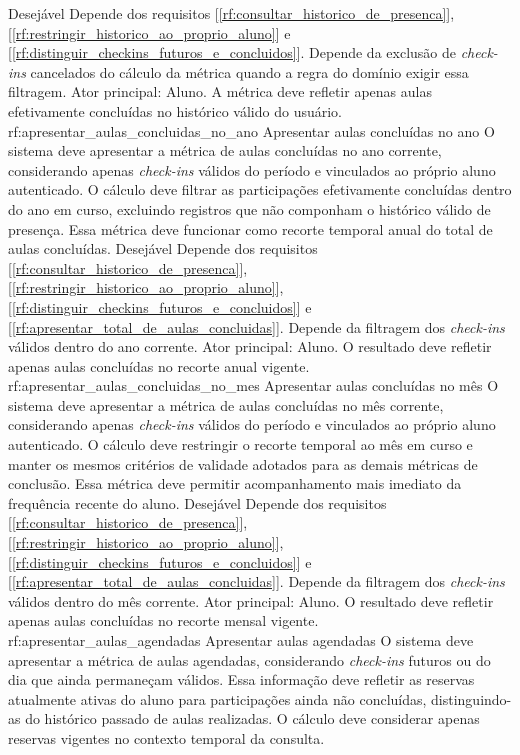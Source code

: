 {Desejável}
{Depende dos requisitos [\ref{rf:consultar_historico_de_presenca}], [\ref{rf:restringir_historico_ao_proprio_aluno}] e [\ref{rf:distinguir_checkins_futuros_e_concluidos}]. Depende da exclusão de \textit{check-ins} cancelados do cálculo da métrica quando a regra do domínio exigir essa filtragem.}
{Ator principal: Aluno. A métrica deve refletir apenas aulas efetivamente concluídas no histórico válido do usuário.}
\reqfuncfull
{rf:apresentar_aulas_concluidas_no_ano}
{Apresentar aulas concluídas no ano}
{O sistema deve apresentar a métrica de aulas concluídas no ano corrente, considerando apenas \textit{check-ins} válidos do período e vinculados ao próprio aluno autenticado. O cálculo deve filtrar as participações efetivamente concluídas dentro do ano em curso, excluindo registros que não componham o histórico válido de presença. Essa métrica deve funcionar como recorte temporal anual do total de aulas concluídas.}
{Desejável}
{Depende dos requisitos [\ref{rf:consultar_historico_de_presenca}], [\ref{rf:restringir_historico_ao_proprio_aluno}], [\ref{rf:distinguir_checkins_futuros_e_concluidos}] e [\ref{rf:apresentar_total_de_aulas_concluidas}]. Depende da filtragem dos \textit{check-ins} válidos dentro do ano corrente.}
{Ator principal: Aluno. O resultado deve refletir apenas aulas concluídas no recorte anual vigente.}
\reqfuncfull
{rf:apresentar_aulas_concluidas_no_mes}
{Apresentar aulas concluídas no mês}
{O sistema deve apresentar a métrica de aulas concluídas no mês corrente, considerando apenas \textit{check-ins} válidos do período e vinculados ao próprio aluno autenticado. O cálculo deve restringir o recorte temporal ao mês em curso e manter os mesmos critérios de validade adotados para as demais métricas de conclusão. Essa métrica deve permitir acompanhamento mais imediato da frequência recente do aluno.}
{Desejável}
{Depende dos requisitos [\ref{rf:consultar_historico_de_presenca}], [\ref{rf:restringir_historico_ao_proprio_aluno}], [\ref{rf:distinguir_checkins_futuros_e_concluidos}] e [\ref{rf:apresentar_total_de_aulas_concluidas}]. Depende da filtragem dos \textit{check-ins} válidos dentro do mês corrente.}
{Ator principal: Aluno. O resultado deve refletir apenas aulas concluídas no recorte mensal vigente.}
\reqfuncfull
{rf:apresentar_aulas_agendadas}
{Apresentar aulas agendadas}
{O sistema deve apresentar a métrica de aulas agendadas, considerando \textit{check-ins} futuros ou do dia que ainda permaneçam válidos. Essa informação deve refletir as reservas atualmente ativas do aluno para participações ainda não concluídas, distinguindo-as do histórico passado de aulas realizadas. O cálculo deve considerar apenas reservas vigentes no contexto temporal da consulta.}
